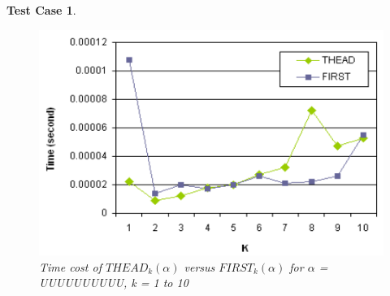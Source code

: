 \documentclass{sig-alternate-05-2015}
\newtheorem{TestCase}{Test Case}
\begin{document}
\begin{TestCase}
\begin{figure}[h]
\centering
\includegraphics[scale=0.5]{figure2.PNG}
\caption{Time cost of $THEAD_k(\alpha)$ versus $FIRST_k(\alpha)$
for $\alpha$ = UUUUUUUUUU, k = 1 to 10}
\label{fig:2}
\end{figure}
\end{TestCase}
\end{document}
